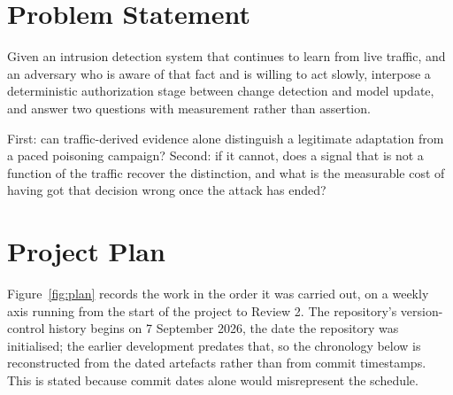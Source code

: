 \documentclass[12pt,a4paper]{report}
\begin{document}
\section{Problem Statement}

Given an intrusion detection system that continues to learn from live traffic,
and an adversary who is aware of that fact and is willing to act slowly,
interpose a deterministic authorization stage between change detection and model
update, and answer two questions with measurement rather than assertion.

First: can traffic-derived evidence alone distinguish a legitimate adaptation
from a paced poisoning campaign? Second: if it cannot, does a signal that is not
a function of the traffic recover the distinction, and what is the measurable
cost of having got that decision wrong once the attack has ended?

\section{Project Plan}

Figure~\ref{fig:plan} records the work in the order it was carried out, on a
weekly axis running from the start of the project to Review 2. The repository's
version-control history begins on 7 September 2026, the date the repository was
initialised; the earlier development predates that, so the chronology below is
reconstructed from the dated artefacts rather than from commit timestamps. This
is stated because commit dates alone would misrepresent the schedule.
\end{document}
